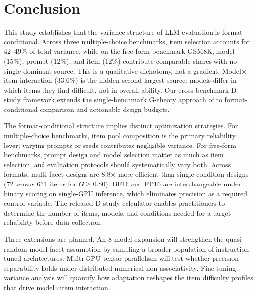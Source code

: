 \section{Conclusion}
\label{sec:conclusion}

This study establishes that the variance structure of LLM evaluation is format-conditional. Across three multiple-choice benchmarks, item selection accounts for 42--49\% of total variance, while on the free-form benchmark GSM8K, model (15\%), prompt (12\%), and item (12\%) contribute comparable shares with no single dominant source. This is a qualitative dichotomy, not a gradient. Model$\times$item interaction (33.6\%) is the hidden second-largest source: models differ in which items they find difficult, not in overall ability. Our cross-benchmark D-study framework extends the single-benchmark G-theory approach of \citet{mesting2026hidden} to format-conditional comparison and actionable design budgets.

The format-conditional structure implies distinct optimization strategies. For multiple-choice benchmarks, item pool composition is the primary reliability lever; varying prompts or seeds contributes negligible variance. For free-form benchmarks, prompt design and model selection matter as much as item selection, and evaluation protocols should systematically vary both. Across formats, multi-facet designs are 8.8$\times$ more efficient than single-condition designs (72 versus 631 items for $G \geq 0.80$). BF16 and FP16 are interchangeable under binary scoring on single-GPU inference, which eliminates precision as a required control variable. The released D-study calculator enables practitioners to determine the number of items, models, and conditions needed for a target reliability before data collection.

Three extensions are planned. An 8-model expansion will strengthen the quasi-random model facet assumption by sampling a broader population of instruction-tuned architectures. Multi-GPU tensor parallelism will test whether precision separability holds under distributed numerical non-associativity. Fine-tuning variance analysis will quantify how adaptation reshapes the item difficulty profiles that drive model$\times$item interaction.
